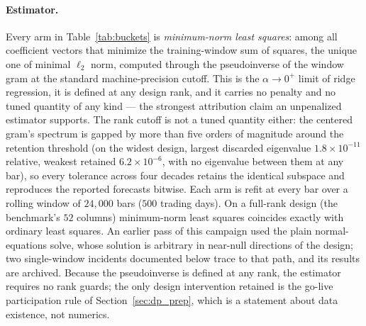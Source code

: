 \paragraph{Estimator.} Every arm in Table~\ref{tab:buckets} is
\emph{minimum-norm least squares}: among all coefficient vectors that
minimize the training-window sum of squares, the unique one of minimal
$\ell_2$ norm, computed through the pseudoinverse of the window gram at
the standard machine-precision cutoff. This is the $\alpha \to 0^{+}$
limit of ridge regression, it is defined at any design rank, and it
carries no penalty and no tuned quantity of any kind --- the strongest
attribution claim an unpenalized estimator supports. The rank cutoff is
not a tuned quantity either: the centered gram's spectrum is gapped by
more than five orders of magnitude around the retention threshold (on
the widest design, largest discarded eigenvalue $1.8 \times 10^{-11}$
relative, weakest retained $6.2 \times 10^{-6}$, with no eigenvalue
between them at any bar), so every tolerance across four decades retains
the identical subspace and reproduces the reported forecasts bitwise. Each arm is refit at
every bar over a rolling window of $24{,}000$ bars ($500$ trading days).
On a full-rank design (the benchmark's $52$ columns) minimum-norm least
squares coincides exactly with ordinary least squares. An earlier pass of
this campaign used the plain normal-equations solve, whose solution is
arbitrary in near-null directions of the design; two single-window
incidents documented below trace to that path, and its results are
archived. Because the pseudoinverse is defined at any rank, the estimator
requires no rank guards; the only design intervention retained is the
go-live participation rule of Section~\ref{sec:dp_prep}, which is a
statement about data existence, not numerics.

